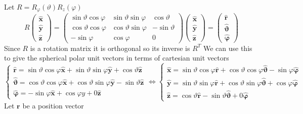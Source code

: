 \documentclass{article}
\newcommand{\vh}[1]{\vec{\hat{#1}}}
\renewcommand{\vec}[1]{\bm{#1}}
\newcommand{\vv}[1]{\vec{#1}}
\begin{document}
Let \(R=R_\varphi(\vartheta)R_z(\varphi)\)
\[R
\begin{pmatrix}
\vh x \\ \vh y \\ \vh z
\end{pmatrix}
=
\begin{pmatrix}
\sin\vartheta\cos\varphi & \sin\vartheta\sin\varphi & \cos\vartheta\\
\cos\vartheta\cos\varphi & \cos\vartheta\sin\varphi & -\sin\vartheta\\
-\sin\varphi & \cos\varphi & 0
\end{pmatrix}
\begin{pmatrix}
\vh x \\ \vh y \\ \vh z
\end{pmatrix}
=
\begin{pmatrix}
\vh r \\ \vh \vartheta \\ \vh \varphi
\end{pmatrix}
\]
Since \(R\) is a rotation matrix it is orthogonal so its inverse is \(R^T\)
We can use this to give the spherical polar unit vectors in terms of cartesian unit vectors
\[\left\{
\begin{array}{l}
\vh r = \sin\vartheta\cos\varphi\vh x+\sin\vartheta\sin\varphi\vh y+\cos\vartheta\vh z\\
\vh \vartheta = \cos\vartheta\cos\varphi\vh x+\cos\vartheta\sin\varphi\vh y-\sin\vartheta\vh z\\
\vh \varphi = -\sin\varphi\vh x+\cos\varphi y+0\vh z
\end{array}
\right.\iff\left\{
\begin{array}{l}
\vh x = \sin\vartheta\cos\varphi\vh r+\cos\vartheta\cos\varphi\vh \vartheta-\sin\varphi\vh \varphi\\
\vh y = \sin\vartheta\sin\varphi\vh r+\cos\vartheta\sin\varphi\vh \vartheta+\cos\varphi\vh \varphi\\
\vh z = \cos\vartheta\vh r-\sin\vartheta\vh \vartheta+0\vh\varphi
\end{array}
\right.\]
Let \(\vv r\) be a position vector
\end{document}
